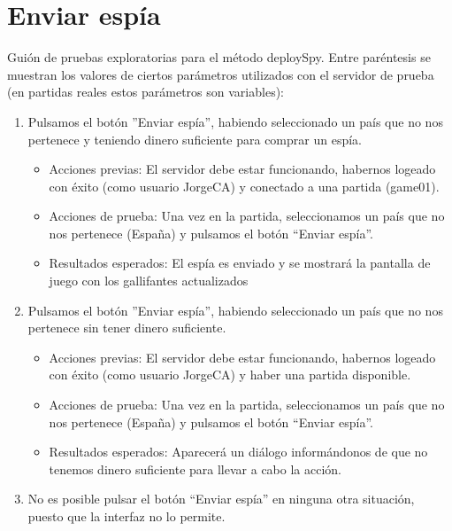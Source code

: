 \section{Enviar espía}

Guión de pruebas exploratorias para el método deploySpy. Entre paréntesis se muestran los valores de ciertos parámetros utilizados con el servidor de prueba (en partidas
reales estos parámetros son variables):

\begin{enumerate}
\item Pulsamos el botón ''Enviar espía'', habiendo seleccionado un país que no nos pertenece y teniendo dinero suficiente para comprar un espía.
	\begin{itemize}
	\item Acciones previas: El servidor debe estar funcionando, habernos logeado con éxito (como usuario JorgeCA) y conectado a una partida (game01).
	\item Acciones de prueba: Una vez en la  partida, seleccionamos un país que no nos pertenece (España) y pulsamos el botón ``Enviar espía''.     
	\item Resultados esperados: El espía es enviado y se mostrará la pantalla de juego con los gallifantes actualizados
	\end{itemize}
\item Pulsamos el botón ''Enviar espía'', habiendo seleccionado un país que no nos pertenece sin tener dinero suficiente.
	\begin{itemize}
	\item Acciones previas: El servidor debe estar funcionando, habernos logeado con éxito (como usuario JorgeCA) y haber una partida disponible.
	\item Acciones de prueba: Una vez en la  partida, seleccionamos un país que no nos pertenece (España) y pulsamos el botón ``Enviar espía''.     
	\item Resultados esperados: Aparecerá un diálogo informándonos de que no tenemos dinero suficiente para llevar a cabo la acción.
	\end{itemize}
\item No es posible pulsar el botón ``Enviar espía'' en ninguna otra situación, puesto que la interfaz no lo permite.

\end{enumerate}

